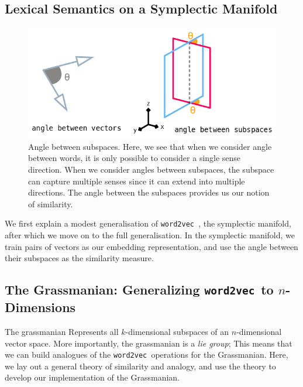 \documentclass[11pt]{book}
\newcommand{\wtov}{\texttt{word2vec }}
\begin{document}


\subsection{Lexical Semantics on a Symplectic Manifold}

\begin{figure}[H]
\includegraphics[width=\textwidth]{./symplectic.png}
\caption{Angle between subspaces. Here, we see that when we consider angle
 between words, it is only possible to consider a single sense direction. When
 we consider angles between subspaces, the subspace can capture multiple senses
 since it can extend into multiple directions.  The angle between the subspaces
 provides us our notion of similarity.}
\end{figure}

We first explain a modest generalisation of \wtov, the symplectic manifold,
after which we move on to the full generalisation. In the symplectic manifold,
we train pairs of vectors as our embedding representation, and use the
angle between their subspaces as the similarity measure.

\subsection{The Grassmanian: Generalizing \wtov to $n$-Dimensions}

The grassmanian Represents all $k$-dimensional subspaces of an $n$-dimensional
vector space. More importantly, the grassmanian is a \emph{lie group}; This means
that we can build analogues of the \wtov operations for the Grassmanian. Here,
we lay out a general theory of similarity and analogy, and use the theory to
develop our implementation of the Grassmanian.
\end{document}
